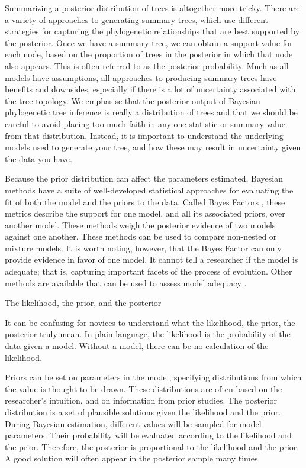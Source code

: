 \documentclass[11pt]{article}
\begin{document}
Summarizing a posterior distribution of trees is altogether more tricky.
There are a variety of approaches to generating summary trees, which use different strategies for capturing the phylogenetic relationships that are best supported by the posterior.
Once we have a summary tree, we can obtain a  support value for each node, based on the proportion of trees in the posterior in which that node also appears. 
This is often referred to as the posterior probability.
Much as all models have assumptions, all approaches to producing summary trees have benefits and downsides, especially if there is a lot of uncertainty associated with the tree topology.
We emphasise that the posterior output of Bayesian phylogenetic tree inference is really a distribution of trees and that we should be careful to avoid placing too much faith in any one statistic or summary value from that distribution.
Instead, it is important to understand the underlying models used to generate your tree, and how these may result in uncertainty given the data you have.

Because the prior distribution can affect the parameters estimated, Bayesian methods have a suite of well-developed statistical approaches for evaluating the fit of both the model and the priors to the data.
Called Bayes Factors \cite{Xie2011}, these metrics describe the support for one model, and all its associated priors, over another model. 
These methods weigh the posterior evidence of two models against one another. 
These methods can be used to compare non-nested or mixture models.
It is worth noting, however, that the Bayes Factor can only provide evidence in favor of one model.
It cannot tell a researcher if the model is adequate; that is, capturing important facets of the process of evolution.
Other methods are available that can be used to assess model adequacy \cite{Brown2009, Brown2014}.


\clearpage
\begin{boxedtext}{The likelihood, the prior, and the posterior}

It can be confusing for novices to understand what the likelihood, the prior, the posterior truly mean.
In plain language, the likelihood is the probability of the data given a model.
Without a model, there can be no calculation of the likelihood.

Priors can be set on parameters in the model, specifying distributions from which the value is thought to be drawn.
These distributions are often based on the researcher's intuition, and on information from prior studies.
The posterior distribution is a set of plausible solutions given the likelihood and the prior.
During Bayesian estimation, different values will be sampled for model parameters.
Their probability will be evaluated according to the likelihood and the prior.
Therefore, the posterior is proportional to the likelihood and the prior.
A good solution will often appear in the posterior sample many times.

\end{boxedtext}
\end{document}

